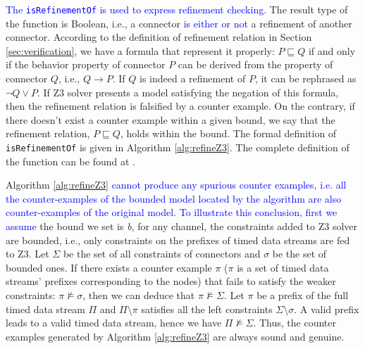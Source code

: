 \documentclass[preprint,3p]{elsarticle}
\newcommand{\liyi}[1]{\textcolor{blue}{#1}}
\newcommand{\xy}[1]{{#1}}
\begin{document}
\liyi{The \texttt{isRefinementOf} is used to express refinement checking}. The result type of the function is Boolean, i.e., a connector \liyi{is either or not} a refinement of another connector. According to the definition of refinement relation in Section \ref{sec:verification}, we have a formula that represent it properly: $P \sqsubseteq Q$ if and only if the behavior property of connector $P$ can be derived from the property of connector $Q$, i.e., $Q \rightarrow P$. If $Q$ is indeed a refinement of $P$, it can be rephrased as $\neg Q \vee P$. If Z3 solver presents a model satisfying the negation of this formula, then the refinement relation is falsified by a counter example. On the contrary, if there doesn't exist a counter example within a given bound, we say that the refinement relation, $P\sqsubseteq Q$, holds within the bound.
The formal definition of \texttt{isRefinementOf} is given in Algorithm \ref{alg:refineZ3}. The complete definition of the function can be found at \cite{reo2coq2Z3}.

 Algorithm \ref{alg:refineZ3} \liyi{cannot produce any spurious counter examples, i.e. all the counter-examples of the bounded model located by the algorithm are also counter-examples of the original model. To illustrate this conclusion, first we assume} the bound we set is \emph{b}, for any channel, the constraints added to Z3 solver are bounded, i.e., only constraints on the prefixes of timed data streams are fed to Z3. Let $\Sigma$ be the set of all constraints of connectors and $\sigma$ be the set of bounded ones. If there exists a counter example $\pi$ ($\pi$ is a set of timed data streams' prefixes  corresponding to the nodes) that fails to satisfy the weaker constraints: $\pi \nvDash \sigma$, then we can deduce that $\pi \nvDash \Sigma$. \xy{Let $\pi$ be a prefix of the full timed data stream $\Pi$} and $\Pi \setminus \pi$ satisfies all the left constraints $\Sigma \setminus \sigma$.
A valid prefix leads to a valid timed data stream, hence we have $\Pi \nvDash \Sigma$.
Thus, the counter examples generated by Algorithm \ref{alg:refineZ3} are always sound and genuine.
\end{document}
